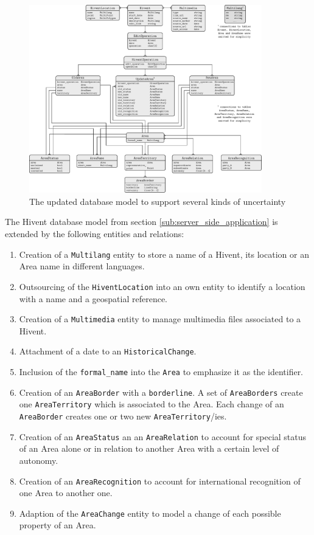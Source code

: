 \begin{figure}[ht]
  \vspace{1em}
  \centering
  \includegraphics[width = 0.9\textwidth]{graphics/extensions/new_database_model}
  \caption{The updated database model to support several kinds of uncertainty}
  \label{fig:new_data_model}
\end{figure}

The Hivent database model from section \ref{sub:server_side_application} is extended by the following entities and relations:

\vspace{-1em}
\begin{enumerate}
  \item Creation of a \texttt{Multilang} entity to store a name of a Hivent, its location or an Area name in different languages.
  \item Outsourcing of the \texttt{HiventLocation} into an own entity to identify a location with a name and a geospatial reference.
  \item Creation of a \texttt{Multimedia} entity to manage multimedia files associated to a Hivent.
  \item Attachment of a date to an \texttt{HistoricalChange}.
  \item Inclusion of the \texttt{formal\_name} into the \texttt{Area} to emphasize it as the identifier.
  \item Creation of an \texttt{AreaBorder} with a \texttt{borderline}. A set of \texttt{AreaBorders} create one \texttt{AreaTerritory} which is associated to the Area. Each change of an \texttt{AreaBorder} creates one or two new \texttt{AreaTerritory}/ies.
  \item Creation of an \texttt{AreaStatus} an an \texttt{AreaRelation} to account for special status of an Area alone or in relation to another Area with a certain level of autonomy.
  \item Creation of an \texttt{AreaRecognition} to account for international recognition of one Area to another one.
  \item Adaption of the \texttt{AreaChange} entity to model a change of each possible property of an Area.
\end{enumerate}

